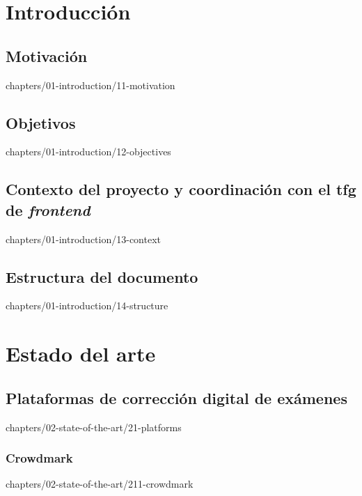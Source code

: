\documentclass[epsbased,tfg,covers,final,printable,extendedindex,%
               firstnumbered,lof,lot, loc]{tfgtfmthesisuam}
\begin{document}

\chapter{Introducción\label{CAP:INTRODUCTION}}
  \section{Motivación\label{SEC:INTRO-MOTIVATION}}%
          {chapters/01-introduction/11-motivation}
  \section{Objetivos\label{SEC:INTRO-OBJECTIVES}}%
          {chapters/01-introduction/12-objectives}
  \section[Contexto del proyecto y coordinación]%
          {Contexto del proyecto y coordinación con el \acs{tfg} de
           \textit{frontend}\label{SEC:INTRO-CONTEXT}}%
          {chapters/01-introduction/13-context}
  \section{Estructura del documento\label{SEC:INTRO-STRUCTURE}}%
          {chapters/01-introduction/14-structure}


\chapter{Estado del arte\label{CAP:STATE-OF-THE-ART}}
  \section[Plataformas de corrección digital]%
          {Plataformas de corrección digital de
           exámenes\label{SEC:SOTA-PLATFORMS}}%
          {chapters/02-state-of-the-art/21-platforms}
    \subsection{Crowdmark\label{SS:SOTA-CROWDMARK}}%
                {chapters/02-state-of-the-art/211-crowdmark}
\end{document}
